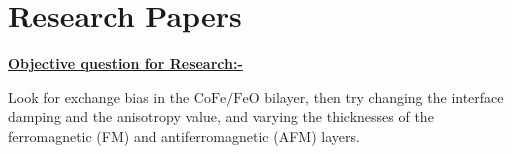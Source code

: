 \chapter{Research Papers}
\label{chap:research-papers}

\underline{\textbf{Objective question for Research:-}}


Look for exchange bias in the $\mathrm{CoFe/FeO}$ bilayer, then try changing the interface damping and the anisotropy value, and varying the thicknesses of the ferromagnetic (FM) and antiferromagnetic (AFM) layers.



